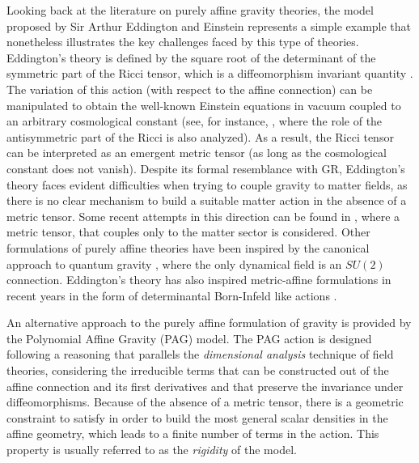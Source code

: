 \documentclass[epj]{svjour}
\begin{document}
Looking back at the literature on purely affine gravity theories, the model proposed by  Sir Arthur  Eddington and Einstein \cite{Eddington1923-EDDTMT,schrodinger1985space,Einstein:1923:AFG} represents a simple example that nonetheless illustrates the key challenges faced by this type of theories. Eddington's theory is defined by the square root of the determinant of the symmetric part of the Ricci tensor, which is a diffeomorphism invariant quantity \cite{eisenhart1972non}. The variation of this action (with respect to the affine connection) can be manipulated to obtain the well-known Einstein equations in vacuum coupled to an arbitrary cosmological constant (see, for instance, \cite{POP_AWSKI_2007}, where the role of the antisymmetric part of the Ricci is also analyzed). As a result, the Ricci tensor can be interpreted as an emergent metric tensor (as long as the cosmological constant does not vanish). Despite its formal resemblance with GR, Eddington's theory faces evident difficulties when trying to couple gravity to matter fields, as there is no clear mechanism to build a suitable matter action in the absence of a metric tensor. Some recent attempts in this direction can be found in \cite{Knorr_2021,POP_AWSKI_2008,Pop_awski_2009,Filippov_2010,Azri_2015}, where  a metric tensor, that couples only to the matter sector is considered. Other formulations of purely affine theories have been inspired by the canonical approach to quantum gravity \cite{Krasnov_2011}, where the only dynamical field is an $SU(2)$ connection. Eddington's theory has also inspired metric-affine formulations  in recent years in the form of determinantal Born-Infeld like actions \cite{BI_Gravity,Deser_1998,Vollick:2003qp,Banados:2010ix,Jim_nez_2021,Afonso:2021aho}. 

An alternative approach to the purely affine formulation of gravity is provided by the Polynomial Affine Gravity (PAG) model. The PAG action is designed following a reasoning that parallels the \textit{dimensional analysis} technique of field theories, considering the irreducible terms that can be constructed out of the affine connection and its first derivatives and that preserve the invariance under diffeomorphisms. Because of the absence of a metric tensor, there is a geometric constraint to satisfy in order to build the most general scalar densities in the affine geometry, which leads to a finite number of terms in the action. This property is usually referred to as the \textit{rigidity} of the model.
\end{document}
